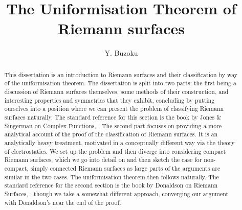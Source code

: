 \documentclass[11pt]{report}
\title{The Uniformisation Theorem of Riemann surfaces}
\author{Y. Buzoku}
\theoremstyle{definition}
\begin{document}
\maketitle
\setcounter{tocdepth}{1}  %
\tableofcontents

\newpage
\begin{abstract}
This dissertation is an introduction to Riemann surfaces and their classification by way of the uniformisation theorem. The dissertation is split into two parts; the first being a discussion of Riemann surfaces themselves, some methods of their construction, and interesting properties and symmetries that they exhibit, concluding by putting ourselves into a position where we can present the problem of classifying Riemann surfaces naturally. The standard reference for this section is the book by Jones \& Singerman on Complex Functions, \cite{comfun}. The second part focuses on providing a more analytical account of the proof of the classification of Riemann surfaces. It is an analytically heavy treatment, motivated in a conceptually different way via the theory of electrostatics. We set up the problem and then diverge into considering compact Riemann surfaces, which we go into detail on and then sketch the case for non-compact, simply connected Riemann surfaces as large parts of the arguments are similar in the two cases. The uniformisation theorem then follows naturally. The standard reference for the second section is the book by Donaldson on Riemann Surfaces, \cite{donaldson}, though we take a somewhat different approach, converging our argument with Donaldson's near the end of the proof. 
\end{abstract}
\declaration %
\end{document}
